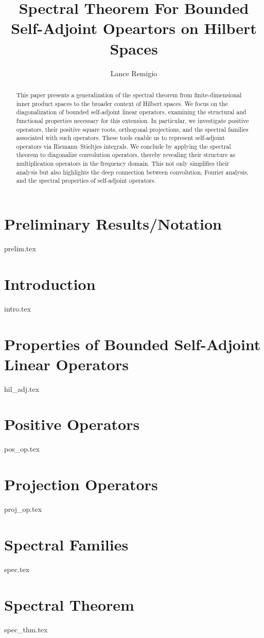 \documentclass[a4paper]{article}
\title{Spectral Theorem For Bounded Self-Adjoint Opeartors on Hilbert Spaces}
\author{Lance Remigio}
\begin{document}
\maketitle
\lhead{\thesection}
\rhead{\thepage}
\tableofcontents

\begin{abstract}
This paper presents a generalization of the spectral theorem from finite-dimensional inner product spaces to the broader context of Hilbert spaces. We focus on the diagonalization of bounded self-adjoint linear operators, examining the structural and functional properties necessary for this extension. In particular, we investigate positive operators, their positive square roots, orthogonal projections, and the spectral families associated with such operators. These tools enable us to represent self-adjoint operators via Riemann–Stieltjes integrals. We conclude by applying the spectral theorem to diagonalize convolution operators, thereby revealing their structure as multiplication operators in the frequency domain. This not only simplifies their analysis but also highlights the deep connection between convolution, Fourier analysis, and the spectral properties of self-adjoint operators.
\end{abstract}

\section{Preliminary Results/Notation}

{prelim.tex}

\section{Introduction}\label{section 2}

{intro.tex}

\section{Properties of Bounded Self-Adjoint Linear Operators}\label{section 3}

{hil_adj.tex}

\section{Positive Operators}\label{section 4}

{pos_op.tex}

\section{Projection Operators}\label{section 5}

{proj_op.tex}

\section{Spectral Families}\label{section 6}

{spec.tex}

\section{Spectral Theorem}\label{section 7}

{spec_thm.tex}
\end{document}
